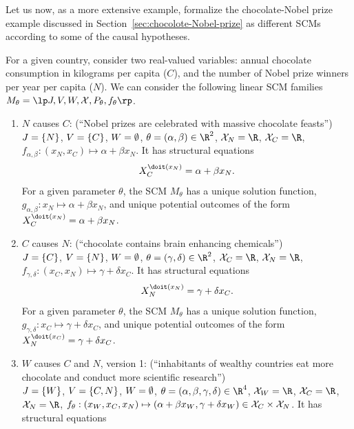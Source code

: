 Let us now, as a more extensive example, formalize the chocolate-Nobel prize example discussed in Section~\ref{sec:chocolote-Nobel-prize} as different SCMs according to some of the causal hypotheses.
\begin{Eg}\label{ex:scms_formal}
   For a given country, consider two real-valued variables: annual chocolate consumption in kilograms per capita ($C$), and the number of Nobel prize winners per year per capita ($N$).
  We can consider the following linear SCM families $M_{\theta} = \lt \Sin, \Send, \Srnd, \CX, P_\theta, f_\theta \rt$. 
  \begin{enumerate}
    \item $N$ causes $C$: (``Nobel prizes are celebrated with massive chocolate feasts'')\\
      $J = \{N\}$, $V = \{C\}$, $W = \emptyset$, $\theta = (\alpha,\beta) \in \RN^2$, 
      $\C{X}_N = \RN$, $\C{X}_C = \RN$, $f_{\alpha,\beta} : (x_N,x_C) \mapsto \alpha + \beta x_N$.
      It has structural equations
      $$X_C^{\doit(x_N)} = \alpha + \beta x_N.$$
      For a given parameter $\theta$, the SCM $M_{\theta}$ has 
      a unique solution function, $g_{\alpha,\beta} : x_N \mapsto \alpha + \beta x_N$, and
      unique potential outcomes of the form $X_C^{\doit(x_N)} = \alpha + \beta x_N$.
    \item $C$ causes $N$: (``chocolate contains brain enhancing chemicals'')\\
      $J = \{C\}$, $V = \{N\}$, $W = \emptyset$, $\theta = (\gamma,\delta) \in \RN^2$, 
      $\C{X}_C = \RN$, $\C{X}_N = \RN$, $f_{\gamma,\delta} : (x_C,x_N) \mapsto \gamma + \delta x_C$.
      It has structural equations
      $$X_N^{\doit(x_N)} = \gamma + \delta x_C.$$
      For a given parameter $\theta$, the SCM $M_{\theta}$ has 
      a unique solution function, $g_{\gamma,\delta} : x_C \mapsto \gamma + \delta x_C$, and
      unique potential outcomes of the form $X_N^{\doit(x_C)} = \gamma + \delta x_C$.
    \item $W$ causes $C$ and $N$, version 1: (``inhabitants of wealthy countries eat more chocolate and conduct more scientific research'')\\
      $J = \{W\}$, $V = \{C,N\}$, $W = \emptyset$, $\theta = (\alpha,\beta,\gamma,\delta) \in \RN^4$, 
      $\C{X}_W = \RN$, $\C{X}_C = \RN$, $\C{X}_N = \RN$, $f_{\theta} : (x_W,x_C,x_N) \mapsto (\alpha + \beta x_W, \gamma + \delta x_W) \in \mathcal{X}_C \times \mathcal{X}_N$.
      It has structural equations
      \begin{align*}

\end{align*}
\end{enumerate}
\end{Eg}
